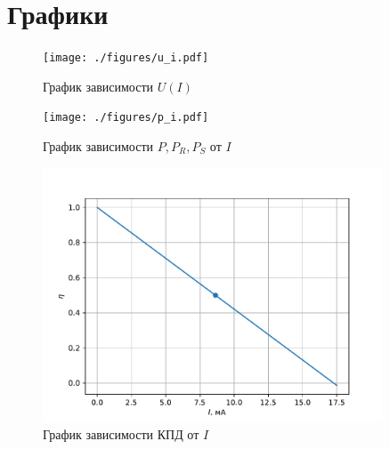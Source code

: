 \section{Графики}
\begin{figure}[H]
  \centering
	\texttt{[image: ./figures/u\_i.pdf]}
	\caption{График зависимости $U(I)$}\label{fig:u_i}
\end{figure}

\begin{figure}[H]
  \centering
	\texttt{[image: ./figures/p\_i.pdf]}
	\caption{График зависимости $P, P_R, P_S$ от $I$}\label{fig:p_i}
\end{figure}

\begin{figure}[H]
  \centering
	\includegraphics[width=0.9\textwidth]{./figures/eta_i.pdf}
  \caption{График зависимости КПД от $I$}\label{fig:eta_i}
\end{figure}
